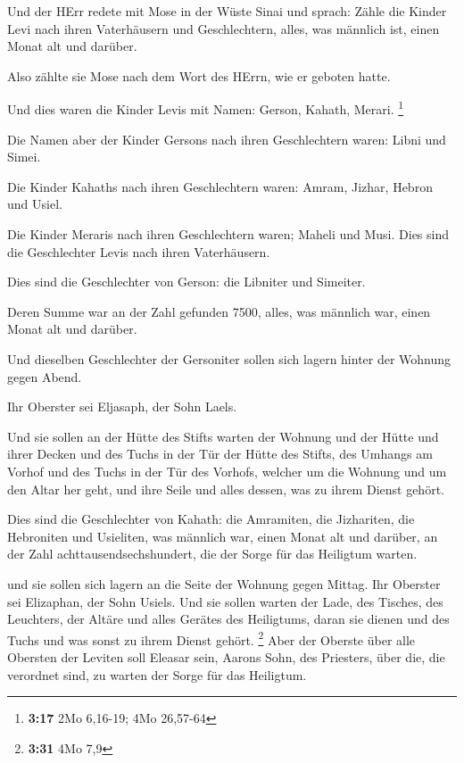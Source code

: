  Und der HErr redete mit Mose in der Wüste Sinai und
sprach:  Zähle die Kinder Levi nach ihren Vaterhäusern und
Geschlechtern, alles, was männlich ist, einen Monat alt und darüber.

 Also zählte sie Mose nach dem Wort des HErrn, wie er
geboten hatte.

 Und dies waren die Kinder Levis mit Namen: Gerson, Kahath,
Merari. \footnote{\textbf{3:17} 2Mo 6,16-19; 4Mo 26,57-64}

 Die Namen aber der Kinder Gersons nach ihren Geschlechtern
waren: Libni und Simei.

 Die Kinder Kahaths nach ihren Geschlechtern waren: Amram,
Jizhar, Hebron und Usiel.

 Die Kinder Meraris nach ihren Geschlechtern waren; Maheli
und Musi. Dies sind die Geschlechter Levis nach ihren Vaterhäusern.

 Dies sind die Geschlechter von Gerson: die Libniter und
Simeiter.

 Deren Summe war an der Zahl gefunden 7500, alles, was
männlich war, einen Monat alt und darüber.

 Und dieselben Geschlechter der Gersoniter sollen sich
lagern hinter der Wohnung gegen Abend.

 Ihr Oberster sei Eljasaph, der Sohn Laels.

 Und sie sollen an der Hütte des Stifts warten der Wohnung
und der Hütte und ihrer Decken und des Tuchs in der Tür der Hütte des
Stifts,  des Umhangs am Vorhof und des Tuchs in der Tür des
Vorhofs, welcher um die Wohnung und um den Altar her geht, und ihre
Seile und alles dessen, was zu ihrem Dienst gehört.

 Dies sind die Geschlechter von Kahath: die Amramiten, die
Jizhariten, die Hebroniten und Usieliten,  was männlich
war, einen Monat alt und darüber, an der Zahl achttausendsechshundert,
die der Sorge für das Heiligtum warten.

 und sie sollen sich lagern an die Seite der Wohnung gegen
Mittag.  Ihr Oberster sei Elizaphan, der Sohn Usiels.
 Und sie sollen warten der Lade, des Tisches, des
Leuchters, der Altäre und alles Gerätes des Heiligtums, daran sie dienen
und des Tuchs und was sonst zu ihrem Dienst gehört. \footnote{\textbf{3:31}
  4Mo 7,9}  Aber der Oberste über alle Obersten der Leviten
soll Eleasar sein, Aarons Sohn, des Priesters, über die, die verordnet
sind, zu warten der Sorge für das Heiligtum.

